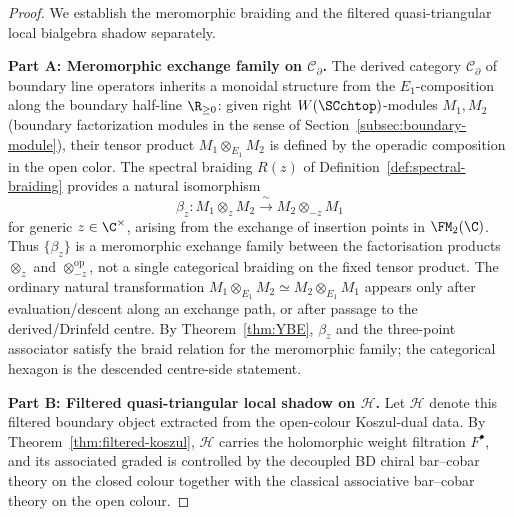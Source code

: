 \begin{proof}
We establish the meromorphic braiding and the filtered
quasi-triangular local bialgebra shadow separately.

\medskip
\noindent\textbf{Part A: Meromorphic exchange family on $\mathcal{C}_\partial$.}
The derived category $\mathcal{C}_\partial$ of boundary line operators inherits a monoidal structure from the $E_1$-composition along the boundary half-line $\R_{\geq 0}$: given right $W(\SCchtop)$-modules $M_1, M_2$ (boundary factorization modules in the sense of Section~\ref{subsec:boundary-module}), their tensor product $M_1 \otimes_{E_1} M_2$ is defined by the operadic composition in the open color. The spectral braiding $R(z)$ of Definition~\ref{def:spectral-braiding} provides a natural isomorphism
\[
\beta_z \colon M_1 \otimes_z M_2 \xrightarrow{\ \sim\ } M_2 \otimes_{-z} M_1
\]
for generic $z \in \C^\times$, arising from the exchange of insertion
points in $\FM_2(\C)$. Thus $\{\beta_z\}$ is a meromorphic exchange
family between the factorisation products $\otimes_z$ and
$\otimes_{-z}^{\mathrm{op}}$, not a single categorical braiding on
the fixed tensor product. The ordinary natural transformation
$M_1\otimes_{E_1}M_2\simeq M_2\otimes_{E_1}M_1$ appears only after
evaluation/descent along an exchange path, or after passage to the
derived/Drinfeld centre. By Theorem~\ref{thm:YBE}, $\beta_z$ and the
three-point associator satisfy the braid relation for the meromorphic
family; the categorical hexagon is the descended centre-side
statement.

\medskip
\noindent\textbf{Part B: Filtered quasi-triangular local shadow on $\mathcal{H}$.}
Let $\mathcal{H}$ denote this filtered boundary object extracted from
the open-colour Koszul-dual data. By
Theorem~\ref{thm:filtered-koszul}, $\mathcal{H}$ carries the
holomorphic weight filtration $F^\bullet$, and its associated graded
is controlled by the decoupled BD chiral bar--cobar theory on the
closed colour together with the classical associative bar--cobar
theory on the open colour.


\end{proof}
